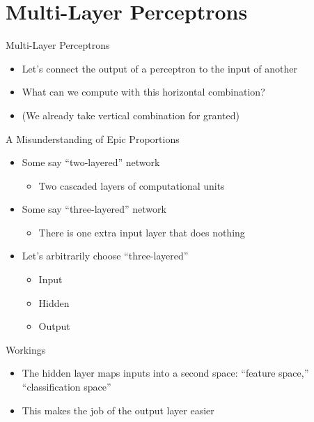 \documentclass[size=14pt,
  style=tycja,
  paper=screen,
  ]{powerdot}
\begin{document}
\section{Multi-Layer Perceptrons}

\begin{slide}{Multi-Layer Perceptrons}
  \begin{itemize}
  \item Let's connect the output of a perceptron to the input of another
  \item What can we compute with this horizontal combination?
  \item (We already take vertical combination for granted)
  \end{itemize}
\end{slide}

\begin{slide}{A Misunderstanding of Epic Proportions}
  \begin{itemize}
  \item Some say ``two-layered'' network
    \begin{itemize}
      \item Two cascaded layers of computational units
    \end{itemize}
  \item Some say ``three-layered'' network
    \begin{itemize}
      \item There is one extra input layer that does nothing
    \end{itemize}
  \item Let's arbitrarily choose ``three-layered''
    \begin{itemize}
      \item Input
      \item Hidden
      \item Output
    \end{itemize}
  \end{itemize}
\end{slide}

\begin{slide}{Workings}
  \begin{itemize}
  \item The hidden layer maps inputs into a second space: ``feature space,'' ``classification space''
  \item This makes the job of the output layer easier
  \end{itemize}
\end{slide}
\end{document}
